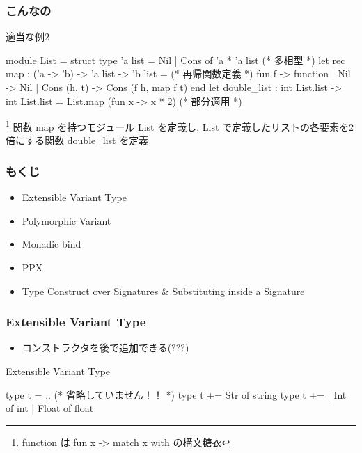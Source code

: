 \documentclass[dvipdfmx,14pt,notheorems,aspectratio=169]{beamer}
\theoremstyle{definition}
\begin{document}
    \begin{frame}[fragile]\frametitle{こんなの}
        \begin{exampleblock}{適当な例2}
            \scriptsize
            \begin{verbatimtab}
module List = struct
    type 'a list = Nil | Cons of 'a * 'a list (* 多相型 *)
    let rec map : ('a -> 'b) -> 'a list -> 'b list = (* 再帰関数定義 *)
        fun f -> function
        | Nil -> Nil
        | Cons (h, t) -> Cons (f h, map f t)
end
let double_list : int List.list -> int List.list =
    List.map (fun x -> x * 2) (* 部分適用 *)
\end{verbatimtab}
        \end{exampleblock}
        \footnote{function は fun x -> match x with の構文糖衣}
        関数 map を持つモジュール List を定義し, List で定義したリストの各要素を2倍にする関数 double\_list を定義
    \end{frame}

    \begin{frame}[fragile]\frametitle{もくじ}
        \begin{itemize}
            \item Extensible Variant Type
            \item Polymorphic Variant
            \item Monadic bind
            \item PPX
            \item Type Construct over Signatures \& Substituting inside a Signature
        \end{itemize}
    \end{frame}

    \begin{frame}[fragile]\frametitle{Extensible Variant Type}
        \begin{itemize}
            \item コンストラクタを後で追加できる(???)
        \end{itemize}
        \begin{exampleblock}{Extensible Variant Type}
            \scriptsize
            \begin{verbatimtab}
type t = .. (* 省略していません！！ *)
type t += Str of string
type t +=
    | Int of int
    | Float of float
\end{verbatimtab}
        \end{exampleblock}
    \end{frame}
\end{document}
